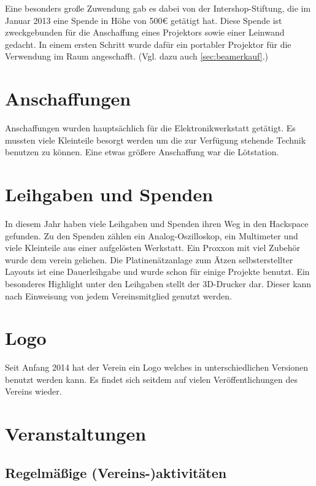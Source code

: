 \documentclass[10pt,DIV16]{scrartcl}
\begin{document}
Eine besonders große Zuwendung gab es dabei von der 
Intershop-Stiftung, die im Januar 2013 eine Spende in Höhe von 
500\euro{} getätigt hat. Diese Spende ist zweckgebunden für die 
Anschaffung eines Projektors sowie einer Leinwand gedacht. In einem 
ersten Schritt wurde dafür ein portabler Projektor für die Verwendung 
im Raum angeschafft. (Vgl. dazu auch \ref{sec:beamerkauf}.)

\section{Anschaffungen}
\label{sec:anschaffungen}

Anschaffungen wurden hauptsächlich für die Elektronikwerkstatt getätigt. 
Es mussten viele Kleinteile besorgt werden um die zur Verfügung stehende Technik benutzen zu können. 
Eine etwas größere Anschaffung war die Lötstation. 

\section{Leihgaben und Spenden}

In diesem Jahr haben viele Leihgaben und Spenden ihren Weg in den Hackspace gefunden. 
Zu den Spenden zählen ein Analog-Oszilloskop, ein Multimeter und viele Kleinteile aus einer aufgelösten Werkstatt. 
Ein Proxxon mit viel Zubehör wurde dem verein geliehen. 
Die Platinenätzanlage zum Ätzen selbsterstellter Layouts ist eine Dauerleihgabe und wurde schon für einige Projekte benutzt. 
Ein besonderes Highlight unter den Leihgaben stellt der 3D-Drucker dar. 
Dieser kann nach Einweisung von jedem Vereinsmitglied genutzt werden. 

\section{Logo}

Seit Anfang 2014 hat der Verein ein Logo welches in unterschiedlichen Versionen benutzt werden kann. Es findet sich seitdem auf vielen Veröffentlichungen des Vereins wieder. 

\section{Veranstaltungen}

\subsection{Regelmäßige (Vereins-)aktivitäten}
\end{document}
